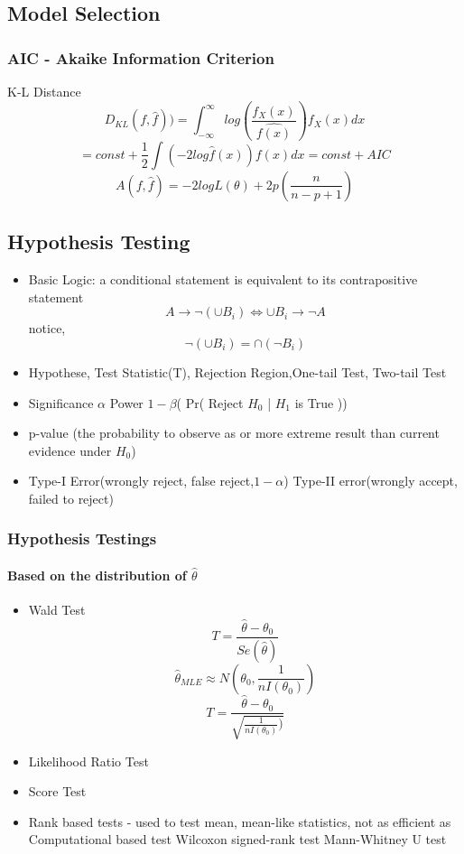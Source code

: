 \documentclass[11pt, openany]{book}              %
\begin{document}
\subsection{Model Selection}

\subsubsection{AIC - Akaike Information Criterion}

	K-L Distance
	$$D_{KL}(f,\hat{f})) = \int_{-\infty}^{\infty} log(\frac{f_X(x)}{\hat{f(x)}})f_X(x)dx $$
	$$ = const + \frac{1}{2} \int (-2log\hat{f}(x))f(x)dx = const + AIC $$
	$$ A(f,\hat{f}) = -2 logL(\theta) + 2 p (\frac{n}{n-p+1})$$

\subsection{Hypothesis Testing}

\begin{itemize}
	\item Basic Logic: a conditional statement is equivalent to its contrapositive statement
		$$ A \rightarrow \neg (\cup B_i) \Leftrightarrow \cup B_i \rightarrow \neg A$$ 
		notice, 
		$$\neg (\cup B_i) = \cap (\neg B_i)$$
    \item Hypothese, Test Statistic(T), Rejection Region,One-tail Test, Two-tail Test
    \item 
    	\subitem Significance $\alpha$
    	\subitem Power $1-\beta$( Pr( Reject $H_0$ | $H_1$ is True ))
    \item p-value (the probability to observe as or more extreme result than current evidence under $H_0$)   
    \item 
    	\subitem Type-I Error(wrongly reject, false reject,$1-\alpha$)
    	\subitem Type-II error(wrongly accept, failed to reject)
\end{itemize}

\subsubsection{Hypothesis Testings}

\paragraph{Based on the distribution of $\hat{\theta}$}

\begin{itemize}
    \item Wald Test $$T = \frac{\hat{\theta} - \theta_0}{Se(\hat{\theta})}$$
    $$ \hat{\theta}_{MLE} \approx N(\theta_0, \frac{1}{n I(\theta_0)})$$
   $$T = \frac{\hat{\theta} - \theta_0}{\sqrt{\frac{1}{nI(\theta_0)})}}$$
    \item Likelihood Ratio Test
    \item Score Test
    \item Rank based tests - used to test mean, mean-like statistics, not as efficient as Computational based test
    	\subitem Wilcoxon signed-rank test
    	\subitem Mann-Whitney U test
\end{itemize}
\end{document}
